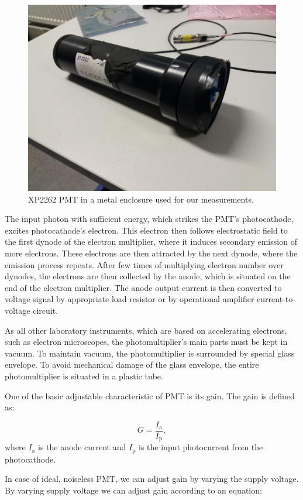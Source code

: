 \begin{figure}[H]
 \centering
 \includegraphics[scale = 0.08, angle = 180]{./pictures/XP2262}
 \caption{XP2262 PMT in a metal enclosure used for our measurements.}
 \label{XP2262 PMT}
\end{figure}

\par
The input photon with sufficient energy, which strikes the PMT's photocathode, excites photocathode's electron. This electron then follows electrostatic field to the first dynode of the electron multiplier, where it induces secondary emission of more electrons. These electrons are then attracted by the next dynode, where the emission process repeats. After few times of multiplying electron number over dynodes, the electrons are then collected by 
the anode, which is situated on the end of the electron multiplier. The anode output current is then converted to voltage signal by appropriate load resistor or by operational amplifier current-to-voltage circuit.
\par
As all other laboratory instruments, which are based on accelerating electrons, such as electron microscopes, the photomultiplier's main parts must be kept in vacuum. To maintain vacuum, the photomultiplier is surrounded by special glass envelope. To avoid mechanical damage of the glass envelope, the entire photomultiplier is situated in a plastic tube.
\par
One of the basic adjustable characteristic of PMT is its gain. The gain is defined as:

\begin{equation}
G = \frac{I_\textrm{a}}{I_\textrm{p}},
\end{equation}
where $I_\textrm{a}$ is the anode current and $I_\textrm{p}$ is the input photocurrent from the photocathode.
\par
In case of ideal, noiseless PMT, we can adjust gain by varying the supply voltage. By varying supply voltage we can adjust gain according to an equation:

